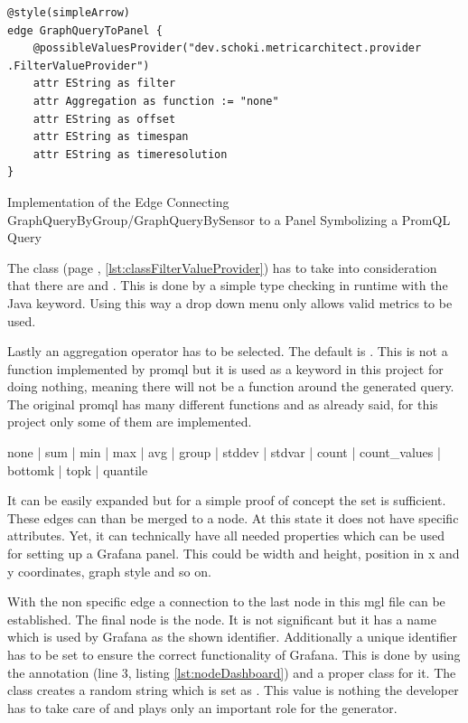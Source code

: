 \begin{listing}[H]
	\begin{verbatim}
@style(simpleArrow)
edge GraphQueryToPanel {
	@possibleValuesProvider("dev.schoki.metricarchitect.provider .FilterValueProvider")
	attr EString as filter
	attr Aggregation as function := "none"
	attr EString as offset
	attr EString as timespan
	attr EString as timeresolution
}
	\end{verbatim}
	\caption{Implementation of the Edge Connecting GraphQueryByGroup/GraphQueryBySensor to a Panel Symbolizing a PromQL Query}
	\label{lst:GraphQueryToPanel}
\end{listing}

The  class (page \pageref{lst:classFilterValueProvider}, \cref{lst:classFilterValueProvider}) has to take into consideration that there are  and . This is done by a simple type checking in runtime with the Java  keyword. Using this way a drop down menu only allows valid metrics to be used.

Lastly an aggregation operator has to be selected. The default is . This is not a function implemented by \gls{promql} but it is used as a keyword in this project for doing nothing, meaning there will not be a function around the generated query. The original \gls{promql} has many different functions and as already said, for this project only some of them are implemented. 

\begin{center}
	none | sum | min | max | avg | group | stddev | stdvar | count | count\_values | bottomk | topk  | quantile
\end{center}

It can be easily expanded but for a simple proof of concept the set is sufficient. These edges can than be merged to a  node. At this state it does not have specific attributes. Yet, it can technically have all needed properties which can be used for setting up a Grafana panel. This could be width and height, position in x and y coordinates, graph style and so on.

With the non specific edge  a connection to the last node in this \gls{mgl} file can be established. The final node is the  node. It is not significant but it has a name which is used by Grafana as the shown identifier. Additionally a unique identifier has to be set to ensure the correct functionality of Grafana. This is done by using the  annotation (line 3, listing \ref{lst:nodeDashboard}) and a proper class for it. The class  creates a random string which is set as . This value is nothing the developer has to take care of and plays only an important role for the generator.

